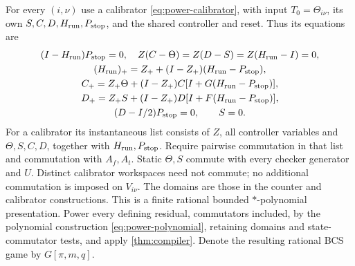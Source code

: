 For every $(i,\nu)$ use a calibrator \eqref{eq:power-calibrator}, with input $T_0=\Theta_{i\nu}$, its own $S,C,D,H_{\rm run},P_{\rm stop}$, and the shared controller and reset. Thus its equations are
\begin{equation}\label{eq:profile-calibrator}
\begin{gathered}
 (I-H_{\rm run})P_{\rm stop}=0,\quad Z(C-\Theta)=Z(D-S)=Z(H_{\rm run}-I)=0,\\
 (H_{\rm run})_+=Z_++(I-Z_+)(H_{\rm run}-P_{\rm stop}),\\
 C_+=Z_+\Theta+(I-Z_+)C[I+G(H_{\rm run}-P_{\rm stop})],\\
 D_+=Z_+S+(I-Z_+)D[I+F(H_{\rm run}-P_{\rm stop})],\\
 (D-I/2)P_{\rm stop}=0,\qquad S=0.
\end{gathered}
\end{equation}
For a calibrator its instantaneous list consists of $Z$, all controller variables and $\Theta,S,C,D$, together with $H_{\rm run},P_{\rm stop}$. Require pairwise commutation in that list and commutation with $A_f,A_t$. Static $\Theta,S$ commute with every checker generator and $U$. Distinct calibrator workspaces need not commute; no additional commutation is imposed on $V_{i\nu}$. The domains are those in the counter and calibrator constructions. This is a finite rational bounded $*$-polynomial presentation. Power every defining residual, commutators included, by the polynomial construction \eqref{eq:power-polynomial}, retaining domains and state-commutator tests, and apply \cref{thm:compiler}. Denote the resulting rational BCS game by $G[\pi,m,q]$.

